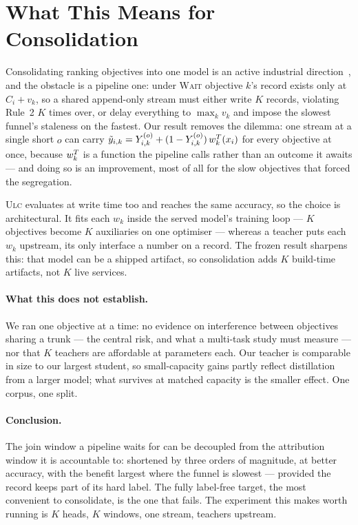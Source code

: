 \section{What This Means for Consolidation}
\label{sec:consolidation}

Consolidating ranking objectives into one model is an active industrial
direction~\cite{meta2025gem}, and the obstacle is a pipeline one: under \textsc{Wait}
objective $k$'s record exists only at $C_i+v_k$, so a shared append-only stream must either
write $K$ records, violating Rule~2 $K$ times over, or delay everything to $\max_k v_k$ and
impose the slowest funnel's staleness on the fastest. Our result removes the dilemma: one stream at a single short $o$ can
carry $\tilde y_{i,k} = Y^{(o)}_{i,k} + (1-Y^{(o)}_{i,k})\,w^{T}_k(x_i)$ for every objective at once,
because $w^{T}_k$ is a function the pipeline calls rather than an outcome it awaits --- and doing
so is an improvement, most of all for the slow objectives that forced the segregation.

\textsc{Ulc} evaluates at write time too and reaches the same accuracy, so the choice is
architectural. It fits each $w_k$ inside the served model's training loop --- $K$ objectives
become $K$ auxiliaries on one optimiser --- whereas a teacher puts each $w_k$ upstream, its
only interface a number on a record. The frozen result sharpens this: that model can be a
shipped artifact, so consolidation adds $K$ build-time artifacts, not $K$ live services.

\paragraph{What this does not establish.} We ran one objective at a time: no evidence on
interference between objectives sharing a trunk --- the central risk, and what a multi-task
study must measure --- nor that $K$ teachers are affordable at \teacherParams{} parameters
each. Our teacher is comparable in size to our largest student, so small-capacity gains partly
reflect distillation from a larger model; what survives at matched capacity is the smaller
effect. One corpus, one split.

\paragraph{Conclusion.} The join window a pipeline waits for can be decoupled from the
attribution window it is accountable to: shortened by three orders of magnitude, at better
accuracy, with the benefit largest where the funnel is slowest --- provided the record keeps
part of its hard label. The fully label-free target, the most convenient to consolidate, is the
one that fails. The experiment this makes worth running is $K$ heads, $K$ windows, one stream,
teachers upstream.
